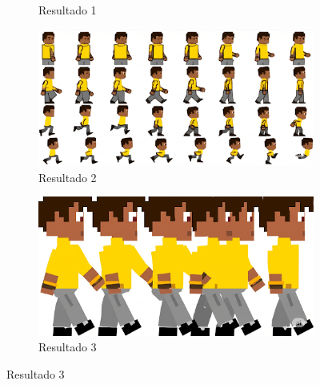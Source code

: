 \begin{figure}[htbp]
\begin{subfigure}{0.3\linewidth}
        \caption{\small Resultado 1}
        \label{fig:geminiProSheet2a}
    \end{subfigure}
    \begin{subfigure}{0.45\linewidth}
        \includegraphics[width=1\linewidth]{figs/geminiPro/chat8/tela2_res2.PNG}
        \caption{\small Resultado 2}
        \label{fig:geminiProSheet2b}
    \end{subfigure}
    \begin{subfigure}{0.45\linewidth}
        \includegraphics[width=1\linewidth]{figs/geminiPro/chat8/tela2_res3.PNG}
        \caption{\small Resultado 3}
        \label{fig:geminiProSheet2c}
    \end{subfigure}

\end{figure}

